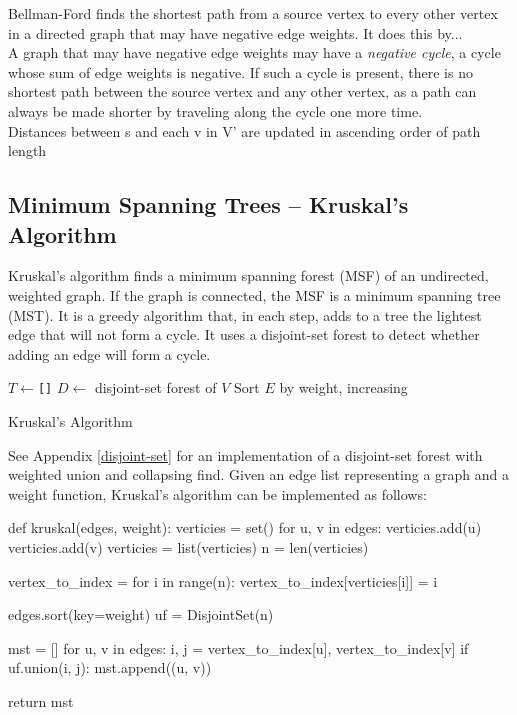 \documentclass[12pt, titlepage]{article}
\begin{document}
Bellman-Ford finds the shortest path from a source vertex to every other vertex in a directed graph that may have negative edge weights. It does this by... \\

A graph that may have negative edge weights may have a \textit{negative cycle}, a cycle whose sum of edge weights is negative. If such a cycle is present, there is no shortest path between the source vertex and any other vertex, as a path can always be made shorter by traveling along the cycle one more time. \\

Distances between s and each v in V' are updated in ascending order of path length

\subsection{Minimum Spanning Trees -- Kruskal's Algorithm} \label{kruskal}

Kruskal's algorithm finds a minimum spanning forest (MSF) of an undirected, weighted graph. If the graph is connected, the MSF is a minimum spanning tree (MST). It is a greedy algorithm that, in each step, adds to a tree the lightest edge that will not form a cycle. It uses a disjoint-set forest to detect whether adding an edge will form a cycle. \\

\begin{algorithm}[H]
  \SetAlgoLined
  \DontPrintSemicolon
  $T \longleftarrow$\hspace{0.5mm}\texttt{[]}\;
  $D \longleftarrow$\hspace{0.5mm} disjoint-set forest of $V$\;
  Sort $E$ by weight, increasing\;
  \;
  \caption{Kruskal's Algorithm}
\end{algorithm} \medskip

See Appendix \ref{disjoint-set} for an implementation of a disjoint-set forest with weighted union and collapsing find. Given an edge list representing a graph and a weight function, Kruskal's algorithm can be implemented as follows: \medskip

\begin{python}
def kruskal(edges, weight):
    verticies = set()
    for u, v in edges:
        verticies.add(u)
        verticies.add(v)
    verticies = list(verticies)
    n = len(verticies)

    vertex_to_index = {}
    for i in range(n):
        vertex_to_index[verticies[i]] = i

    edges.sort(key=weight)
    uf = DisjointSet(n)

    mst = []
    for u, v in edges:
        i, j = vertex_to_index[u], vertex_to_index[v]
        if uf.union(i, j):
            mst.append((u, v))

    return mst
\end{python}
\end{document}
